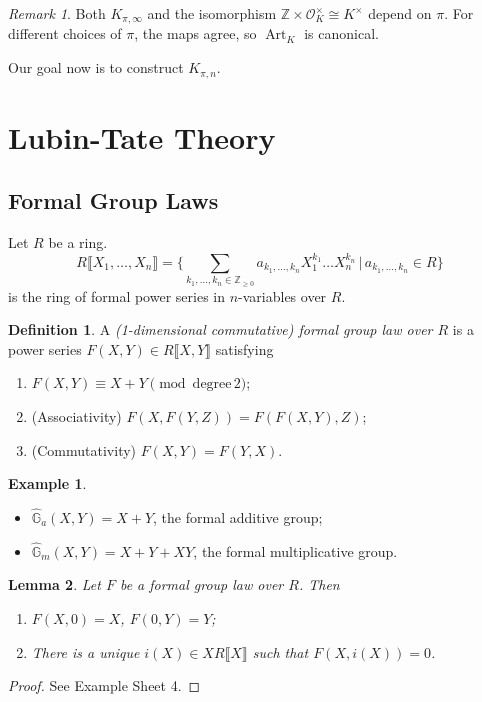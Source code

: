 \documentclass[11pt]{article}
\theoremstyle{definition}
\newtheorem{definition}{Definition}[subsection]
\newtheorem*{example}{Example}
\theoremstyle{plain}
\newtheorem{lemma}[definition]{Lemma}
\theoremstyle{remark}
\newtheorem*{remark}{Remark}
\DeclareMathOperator{\Art}{Art}
\newcommand{\ZZ}{\mathbb{Z}}
\newcommand{\cO}{\mathcal{O}}
\newcommand{\Ghat}{\widehat{\mathbb{G}}}
\begin{document}
\begin{remark}
    Both $K_{\pi, \infty}$ and the isomorphism $\ZZ \times \cO_K^\times \cong K^\times$ depend on $\pi$. For different choices of $\pi$, the maps agree, so $\Art_K$ is canonical.
\end{remark}

Our goal now is to construct $K_{\pi,n}$.

\section{Lubin-Tate Theory}

\subsection{Formal Group Laws}

Let $R$ be a ring.
\begin{equation*}
    R\llbracket X_1, \ldots, X_n \rrbracket = \bigg\{\sum_{k_1, \ldots, k_n \in \ZZ_{\ge 0}} a_{k_1, \ldots, k_n} X_1^{k_1} \ldots X_n^{k_n} \,\bigg\vert\, a_{k_1, \ldots, k_n} \in R\bigg\}
\end{equation*}
is the ring of formal power series in $n$-variables over $R$.

\begin{definition}\label{def:18_1}
    A \emph{(1-dimensional commutative) formal group law over $R$} is a power series $F(X, Y) \in R\llbracket X, Y \rrbracket$ satisfying
    \begin{enumerate}
        \item $F(X, Y) \equiv X + Y \pmod{\textrm{degree}\,2}$;
        \item (Associativity) $F(X, F(Y, Z)) = F(F(X, Y), Z)$;
        \item (Commutativity) $F(X, Y) = F(Y, X)$.
    \end{enumerate}
\end{definition}

\begin{example}\phantom{}
    \begin{itemize}
        \item $\Ghat_a(X, Y) = X + Y$, the formal additive group;
        \item $\Ghat_m(X, Y) = X + Y + XY$, the formal multiplicative group.
    \end{itemize}
\end{example}

\begin{lemma}\label{lem:18_2}
    Let $F$ be a formal group law over $R$. Then
    \begin{enumerate}
        \item $F(X, 0) = X$, $F(0, Y) = Y$;
        \item There is a unique $i(X) \in X R\llbracket X \rrbracket$ such that $F(X, i(X)) = 0$.
    \end{enumerate}
\end{lemma}
\begin{proof}
    See Example Sheet 4.
\end{proof}
\end{document}
